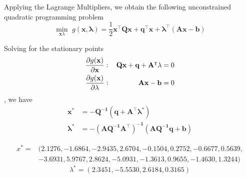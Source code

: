 Applying the Lagrange Multipliers, we obtain the following unconstrained quadratic programming problem
\[
\underset{\mathbf{x} \lambda}{\min}\,\, g(\mathbf{x, \lambda}) = \frac{1}{2}\mathbf{x^\intercal Q \mathbf{x} + q^\intercal x + \lambda^\intercal (Ax - b)}
\]

Solving for the stationary points
\begin{align*}
& \frac{\partial g(\mathbf{x})}{\partial\mathbf{x}}:\, & \mathbf{Qx + q + A^\intercal \lambda} = 0 \\
& \frac{\partial g(\mathbf{x})}{\partial\mathbf{\lambda}}:\, & \mathbf{Ax - b} = 0
\end{align*}
, we have
\begin{align*}
\mathbf{x^*} &=\mathbf{-Q^{-1} (q + A^\intercal \lambda^*)}\\
\mathbf{\lambda^*}&=\mathbf{-(AQ^{-1}A^\intercal)^{-1} (AQ^{-1}q + b)}
\end{align*}

\begin{align*}
x^* = &(2.1276,
   -1.6864,
   -2.9435,
    2.6704,
   -0.1504,
    0.2752,
   -0.6677,
    0.5639,\\
   &-3.6931,
    5.9767,
    2.8624,
   -5.0931,
   -1.3613,
    0.9655,
   -1.4630,
    1.3244
)
\end{align*}
\[
\lambda^* = (    2.3451,
   -5.5530,
    2.6184,
    0.3165)
\]
